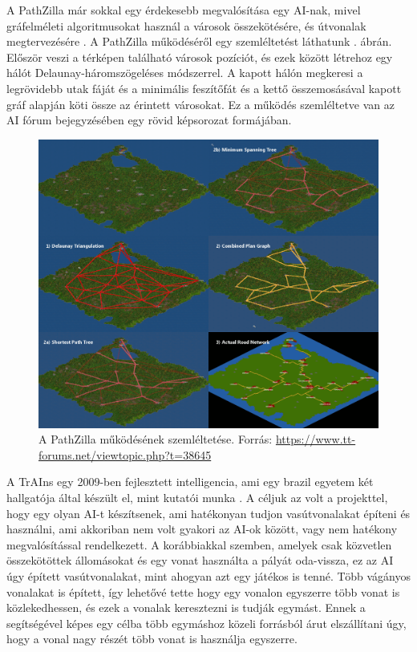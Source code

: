 A PathZilla már sokkal egy érdekesebb megvalósítása egy AI-nak, mivel gráfelméleti algoritmusokat használ a városok összekötésére, és útvonalak megtervezésére \cite{openttdforum}. A PathZilla működéséről egy szemléltetést láthatunk . ábrán. Először veszi a térképen található városok pozíciót, és ezek között létrehoz egy hálót Delaunay-háromszögeléses módszerrel. A kapott hálón megkeresi a legrövidebb utak fáját és a minimális feszítőfát és a kettő összemosásával kapott gráf alapján köti össze az érintett városokat. Ez a működés szemléltetve van az AI fórum bejegyzésében egy rövid képsorozat formájában.

\begin{figure}
	\centering
	\includegraphics[scale=1]{images/pathzilla.png}
	\caption{A PathZilla működésének szemléltetése. Forrás: \url{https://www.tt-forums.net/viewtopic.php?t=38645}}
	\label{fig:pathzilla}
\end{figure}

A TrAIns egy 2009-ben fejlesztett intelligencia, ami egy brazil egyetem két hallgatója által készült el, mint kutatói munka \cite{rios2009trains}. A céljuk az volt a projekttel, hogy egy olyan AI-t készítsenek, ami hatékonyan tudjon vasútvonalakat építeni és használni, ami akkoriban nem volt gyakori az AI-ok között, vagy nem hatékony megvalósítással rendelkezett. A korábbiakkal szemben, amelyek csak közvetlen összekötöttek állomásokat és egy vonat használta a pályát oda-vissza, ez az AI úgy épített vasútvonalakat, mint ahogyan azt egy játékos is tenné. Több vágányos vonalakat is épített, így lehetővé tette hogy egy vonalon egyszerre több vonat is közlekedhessen, és ezek a vonalak keresztezni is tudják egymást. Ennek a segítségével képes egy célba több egymáshoz közeli forrásból árut elszállítani úgy, hogy a vonal nagy részét több vonat is használja egyszerre.

